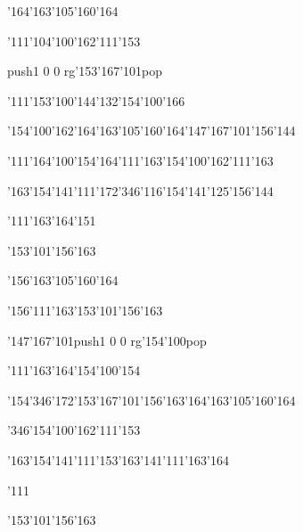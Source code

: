 \null\vfill\ipa\centerline{\enskip\enskip\enskip\enskip\enskip\enskip\enskip\enskip\char'164\char'163\char'105\char'160\char'164}\medskip\centerline{\enskip\char'111\enskip\char'104\char'100\char'162\enskip\enskip\enskip\enskip\enskip\enskip\char'111\char'153}\medskip\centerline{\enskip\enskip\enskip\pdfcolorstack\match push{1 0 0 rg}\char'153\char'167\char'101\pdfcolorstack\match pop{}\enskip\enskip\enskip\enskip\enskip\enskip}\medskip\centerline{\enskip\char'111\char'153\enskip\char'100\char'144\char'132\enskip\enskip\enskip\enskip\char'154\char'100\char'166}\medskip\centerline{\enskip\char'154\char'100\char'162\enskip\char'164\char'163\char'105\char'160\char'164\enskip\char'147\char'167\char'101\char'156\char'144\enskip\enskip\enskip}\medskip\centerline{\enskip\char'111\enskip\char'164\char'100\char'154\enskip\char'164\char'111\char'163\enskip\char'154\char'100\char'162\enskip\char'111\char'163}\medskip\centerline{\enskip\char'163\char'154\char'141\char'111\char'172\enskip\char'346\char'116\enskip\char'154\char'141\char'125\char'156\char'144\enskip\enskip\enskip}\medskip\centerline{\enskip\char'111\enskip\char'163\char'164\char'151\enskip\enskip\enskip\enskip\enskip\enskip}\medskip\centerline{\enskip\enskip\enskip\enskip\enskip\enskip\enskip\enskip\enskip\enskip\enskip\char'153\char'101\char'156\char'163}\medskip\vfill\footline{\hfil\tt\folio\hfil}\eject
\null\vfill\ipa\centerline{\enskip\enskip\enskip\enskip\enskip\enskip\enskip\enskip\char'156\char'163\char'105\char'160\char'164}\medskip\centerline{\enskip\enskip\enskip\char'156\char'111\char'163\enskip\char'153\char'101\char'156\char'163\enskip\enskip\enskip}\medskip\centerline{\enskip\enskip\enskip\char'147\char'167\char'101\enskip\pdfcolorstack\match push{1 0 0 rg}\char'154\char'100\pdfcolorstack\match pop{}\enskip\enskip\enskip}\medskip\centerline{\enskip\enskip\enskip\enskip\char'111\char'163\char'164\enskip\enskip\enskip\enskip\char'154\char'100\char'154}\medskip\centerline{\enskip\char'154\char'346\char'172\enskip\char'153\char'167\char'101\char'156\char'163\enskip\char'164\char'163\char'105\char'160\char'164\enskip\enskip\enskip}\medskip\centerline{\enskip\char'346\enskip\enskip\enskip\enskip\enskip\enskip\enskip\enskip\enskip\char'154\char'100\char'162\enskip\char'111\char'153}\medskip\centerline{\enskip\char'163\char'154\char'141\char'111\char'153\enskip\enskip\enskip\enskip\char'163\char'141\char'111\char'163\char'164\enskip\enskip\enskip}\medskip\centerline{\enskip\char'111\enskip\enskip\enskip\enskip\enskip\enskip\enskip\enskip\enskip\enskip}\medskip\centerline{\enskip\enskip\enskip\enskip\enskip\enskip\enskip\enskip\enskip\enskip\enskip\char'153\char'101\char'156\char'163}\medskip\vfill\footline{\hfil\tt\folio\hfil}\eject
